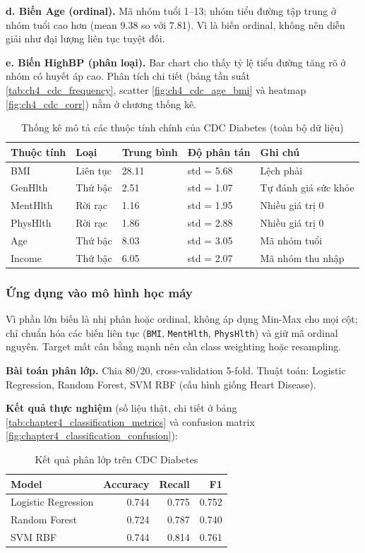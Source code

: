 \textbf{d. Biến Age (ordinal).} Mã nhóm tuổi 1--13; nhóm tiểu đường tập trung ở nhóm tuổi cao hơn (mean 9.38 so với 7.81). Vì là biến ordinal, không nên diễn giải như đại lượng liên tục tuyệt đối.

\textbf{e. Biến HighBP (phân loại).} Bar chart cho thấy tỷ lệ tiểu đường tăng rõ ở nhóm có huyết áp cao. Phân tích chi tiết (bảng tần suất \ref{tab:ch4_cdc_frequency}, scatter \ref{fig:ch4_cdc_age_bmi} và heatmap \ref{fig:ch4_cdc_corr}) nằm ở chương thống kê.

\begin{table}[H]
\centering
\caption{Thống kê mô tả các thuộc tính chính của CDC Diabetes (toàn bộ dữ liệu)}
\label{tab:cdc_descriptive_stats}
\small
\begin{tabular}{lllll}
\toprule
Thuộc tính & Loại & Trung bình & Độ phân tán & Ghi chú \\
\midrule
BMI & Liên tục & 28.11 & std = 5.68 & Lệch phải \\
GenHlth & Thứ bậc & 2.51 & std = 1.07 & Tự đánh giá sức khỏe \\
MentHlth & Rời rạc & 1.16 & std = 1.95 & Nhiều giá trị 0 \\
PhysHlth & Rời rạc & 1.86 & std = 2.88 & Nhiều giá trị 0 \\
Age & Thứ bậc & 8.03 & std = 3.05 & Mã nhóm tuổi \\
Income & Thứ bậc & 6.05 & std = 2.07 & Mã nhóm thu nhập \\
\bottomrule
\end{tabular}
\end{table}

\subsubsection{Ứng dụng vào mô hình học máy}

Vì phần lớn biến là nhị phân hoặc ordinal, không áp dụng Min-Max cho mọi cột; chỉ chuẩn hóa các biến liên tục (\texttt{BMI}, \texttt{MentHlth}, \texttt{PhysHlth}) và giữ mã ordinal nguyên. Target mất cân bằng mạnh nên cần class weighting hoặc resampling.

\textbf{Bài toán phân lớp.} Chia 80/20, cross-validation 5-fold. Thuật toán: Logistic Regression, Random Forest, SVM RBF (cấu hình giống Heart Disease).

\textbf{Kết quả thực nghiệm} (số liệu thật, chi tiết ở bảng \ref{tab:chapter4_classification_metrics} và confusion matrix \ref{fig:chapter4_classification_confusion}):

\begin{table}[H]
\centering
\caption{Kết quả phân lớp trên CDC Diabetes}
\label{tab:cdc_ml_results}
\small
\begin{tabular}{lrrr}
\toprule
Model & Accuracy & Recall & F1 \\
\midrule
Logistic Regression & 0.744 & 0.775 & 0.752 \\
Random Forest & 0.724 & 0.787 & 0.740 \\
SVM RBF & 0.744 & 0.814 & 0.761 \\
\bottomrule
\end{tabular}
\end{table}

